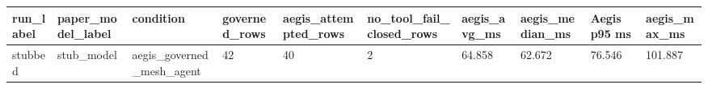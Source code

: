 \begin{tabular}{llllllllll}
 \hline
run\_label & paper\_model\_label & condition & governed\_rows & aegis\_attempted\_rows & no\_tool\_fail\_closed\_rows & aegis\_avg\_ms & aegis\_median\_ms & Aegis p95 ms & aegis\_max\_ms \\
 \hline
stubbed & stub\_model & aegis\_governed\_mesh\_agent & 42 & 40 & 2 & 64.858 & 62.672 & 76.546 & 101.887 \\
 \hline
\end{tabular}
